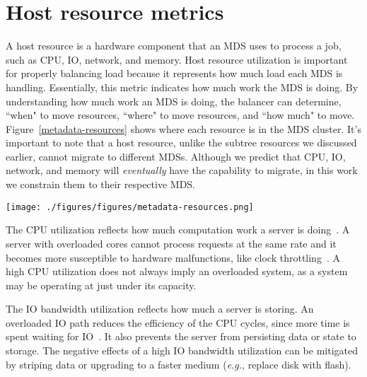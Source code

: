 \section{Host resource metrics}
A host resource is a hardware component that an MDS uses to process a job, such as CPU, IO, network, and memory. Host resource utilization is important for properly balancing load because it represents how much load each MDS is handling. Essentially, this metric indicates how much work the MDS is doing. By understanding how much work an MDS is doing, the balancer can determine, ``when" to move resources, ``where" to move resources, and ``how much" to move. Figure~\ref{metadata-resources} shows where each resource is in the MDS cluster. It's important to note that a host resource, unlike the subtree resources we discussed earlier, cannot migrate to different MDSs. Although we predict that CPU, IO, network, and memory will {\it eventually} have the capability to migrate, in this work we constrain them to their respective MDS. 

\begin{figure*}[tbh]
\centering
	\texttt{[image: ./figures/figures/metadata-resources.png]} 
	\caption{\textbf{Metadata resources}: host resource (CPU, I/O, memory, and network)  represent the local state of each MDS. These local metrics must be aggregated to predict the overall behavior and performance.~\label{metadata-resources}}
\end{figure*}

The CPU utilization reflects how much computation work a server is doing~\cite{shvachko:login2012-hdfs-scalability}. A server with overloaded cores cannot process requests at the same rate and it becomes more susceptible to hardware malfunctions, like clock throttling~\cite{sevilla:discs2013-framework}. A high CPU utilization does not always imply an overloaded system, as a system may be operating at just under its capacity. 

The IO bandwidth utilization reflects how much a server is storing. An overloaded IO path reduces the efficiency of the CPU cycles, since more time is spent waiting for IO~\cite{sevilla:lspp2014-supmr}. It also prevents the server from persisting data or state to storage. The negative effects of a high IO bandwidth utilization can be mitigated by striping data or upgrading to a faster medium ({\it e.g.}, replace disk with flash). 

